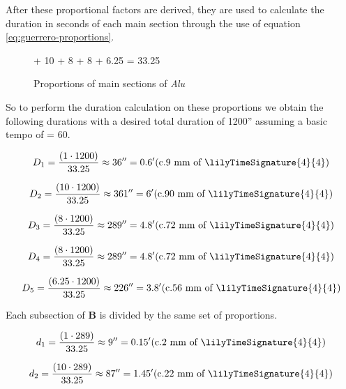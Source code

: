 After these proportional factors are derived, they are used to calculate the duration in seconds of each main section through the use of equation \ref{eq:guerrero-proportions}.

\begin{figure}[H]
     + 10 + 8 + 8 + 6.25 = 33.25
    \caption{Proportions of main sections of \textit{Alu}}
    \label{fig:alu-props}
\end{figure}

So to perform the duration calculation on these proportions we obtain the following durations with a desired total duration of 1200'' assuming a basic tempo of \quarterNote = 60.

\begin{equation}
    D_1 = \frac{(1 \cdot 1200)}{33.25} \approx 36'' = 0.6' (\text{c.9 mm of \lilyTimeSignature{4}{4})}
\end{equation}

\begin{equation}
    D_2 = \frac{(10 \cdot 1200)}{33.25} \approx 361'' = 6' (\text{c.90 mm of \lilyTimeSignature{4}{4})}
\end{equation}

\begin{equation}
    D_3 = \frac{(8 \cdot 1200)}{33.25} \approx 289'' = 4.8' (\text{c.72 mm of \lilyTimeSignature{4}{4})}
\end{equation}

\begin{equation}
    D_4 = \frac{(8 \cdot 1200)}{33.25} \approx 289'' = 4.8' (\text{c.72 mm of \lilyTimeSignature{4}{4})}
\end{equation}

\begin{equation}
    D_5 = \frac{(6.25 \cdot 1200)}{33.25} \approx 226'' = 3.8' (\text{c.56 mm of \lilyTimeSignature{4}{4})}
\end{equation}

Each subsection of \textbf{B} is divided by the same set of proportions.

\begin{equation}
    d_1 = \frac{(1 \cdot 289)}{33.25} \approx 9'' = 0.15' (\text{c.2 mm of \lilyTimeSignature{4}{4})}
\end{equation}

\begin{equation}
    d_2 = \frac{(10 \cdot 289)}{33.25} \approx 87'' = 1.45' (\text{c.22 mm of \lilyTimeSignature{4}{4})}
\end{equation}


